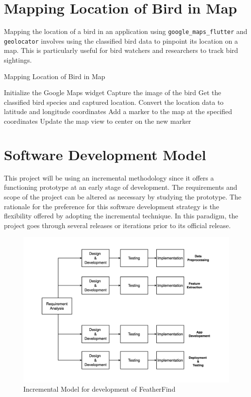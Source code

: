 \section{Mapping Location of Bird in Map}

Mapping the location of a bird in an application using
\texttt{google\_maps\_flutter} and \texttt{geolocator} involves using the classified bird data to
pinpoint its location on a map. This is particularly useful for bird watchers
and researchers to track bird sightings.

\begin{algorithm}
    \caption{Mapping Location of Bird in Map}
    \begin{algorithmic}[1]
        \STATE Initialize the Google Maps widget
        \STATE Capture the image of the bird
        \STATE Get the classified bird species and captured location.
        \STATE Convert the location data to latitude and longitude coordinates
        \STATE Add a marker to the map at the specified coordinates
        \STATE Update the map view to center on the new marker
    \end{algorithmic}
\end{algorithm}

\newpage
\section{Software Development Model}
This project will be using an incremental methodology since it offers a
functioning prototype at an early stage of development. The requirements and
scope of the project can be altered as necessary by studying the prototype. The
rationale for the preference for this software development strategy is the
flexibility offered by adopting the incremental technique. In this paradigm,
the project goes through several releases or iterations prior to its official
release.
\begin{figure}[h!]
    \includegraphics[scale=0.25]{images/SDLC.png}
    \caption{Incremental Model for development of FeatherFind}%
\end{figure}
\newpage

